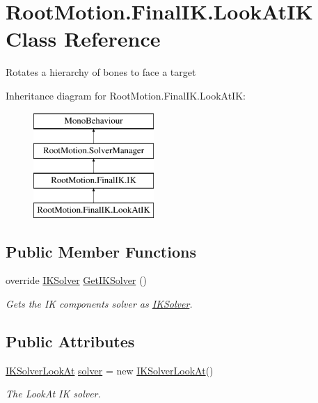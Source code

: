 \hypertarget{class_root_motion_1_1_final_i_k_1_1_look_at_i_k}{}\section{Root\+Motion.\+Final\+I\+K.\+Look\+At\+IK Class Reference}
\label{class_root_motion_1_1_final_i_k_1_1_look_at_i_k}


Rotates a hierarchy of bones to face a target  


Inheritance diagram for Root\+Motion.\+Final\+I\+K.\+Look\+At\+IK\+:\begin{figure}[H]
\begin{center}
\leavevmode
\includegraphics[height=4.000000cm]{class_root_motion_1_1_final_i_k_1_1_look_at_i_k}
\end{center}
\end{figure}
\subsection*{Public Member Functions}
\begin{DoxyCompactItemize}
\item 
override \mbox{\hyperlink{class_root_motion_1_1_final_i_k_1_1_i_k_solver}{I\+K\+Solver}} \mbox{\hyperlink{class_root_motion_1_1_final_i_k_1_1_look_at_i_k_a9a328d936ed493a056797c85b5e8f9dd}{Get\+I\+K\+Solver}} ()
\begin{DoxyCompactList}\small\item\em Gets the IK component\textquotesingle{}s solver as \mbox{\hyperlink{class_root_motion_1_1_final_i_k_1_1_i_k_solver}{I\+K\+Solver}}. \end{DoxyCompactList}\end{DoxyCompactItemize}
\subsection*{Public Attributes}
\begin{DoxyCompactItemize}
\item 
\mbox{\hyperlink{class_root_motion_1_1_final_i_k_1_1_i_k_solver_look_at}{I\+K\+Solver\+Look\+At}} \mbox{\hyperlink{class_root_motion_1_1_final_i_k_1_1_look_at_i_k_ad8a62d2482f33183b88189dc6e64010e}{solver}} = new \mbox{\hyperlink{class_root_motion_1_1_final_i_k_1_1_i_k_solver_look_at}{I\+K\+Solver\+Look\+At}}()
\begin{DoxyCompactList}\small\item\em The Look\+At IK solver. \end{DoxyCompactList}\end{DoxyCompactItemize}
